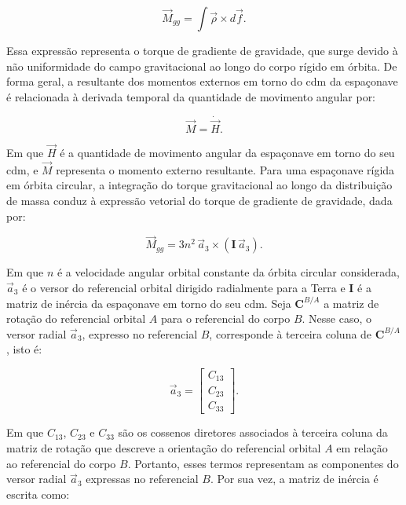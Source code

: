 \begin{equation}
\vec{M}_{gg}
=
\int \vec{\rho}\times d\vec{f}.
\label{eq_torque_gg_integral}
\end{equation}

Essa expressão representa o torque de gradiente de gravidade, que surge devido à não uniformidade do campo gravitacional ao longo do corpo rígido em órbita.
De forma geral, a resultante dos momentos externos em torno do \gls{cdm} da espaçonave é relacionada à derivada temporal da quantidade de movimento angular por:

\begin{equation}
\vec{M}
=
\dot{\vec{H}}.
\label{eq_wie_M_Hdot}
\end{equation}

Em que $\vec{H}$ é a quantidade de movimento angular da espaçonave em torno do seu \gls{cdm}, e $\vec{M}$ representa o momento externo resultante.
Para uma espaçonave rígida em órbita circular, a integração do torque gravitacional ao longo da distribuição de massa conduz à expressão vetorial do torque de gradiente de gravidade, dada por:

\begin{equation}
\vec{M}_{gg}
=
3n^2\,\vec{a}_3 \times \left(\mathbf{I}\,\vec{a}_3\right).
\label{eq_torque_gradiente_gravidade}
\end{equation}

Em que $n$ é a velocidade angular orbital constante da órbita circular considerada, $\vec{a}_3$ é o versor do referencial orbital dirigido radialmente para a Terra e $\mathbf{I}$ é a matriz de inércia da espaçonave em torno do seu \gls{cdm}.
Seja $\mathbf{C}^{B/A}$ a matriz de rotação do referencial orbital $A$ para o referencial do corpo $B$. Nesse caso, o versor radial $\vec a_3$, expresso no referencial $B$, corresponde à terceira coluna de $\mathbf{C}^{B/A}$, isto é:

\begin{equation}
\vec a_3 =
\begin{bmatrix}
C_{13}\\
C_{23}\\
C_{33}
\end{bmatrix}.
\label{eq_a3_corpo}
\end{equation}

Em que $C_{13}$, $C_{23}$ e $C_{33}$ são os cossenos diretores associados à terceira coluna da matriz de rotação que descreve a orientação do referencial orbital $A$ em relação ao referencial do corpo $B$. Portanto, esses termos representam as componentes do versor radial $\vec a_3$ expressas no referencial $B$.
Por sua vez, a matriz de inércia é escrita como:

